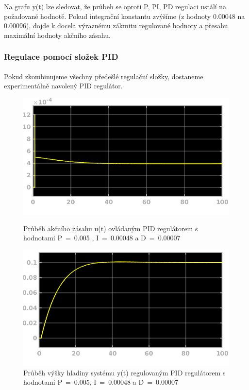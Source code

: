 \documentclass{article}
\begin{document}
	   		
	   		Na grafu y(t) lze sledovat, že průbeh se oproti P, PI, PD regulaci ustálí na požadované hodnotě. Pokud integrační konstantu zvýšíme (z hodnoty 0.00048 na 0.00096), dojde k docela výraznému zákmitu regulované hodnoty a přesahu maximální hodnoty akčního zásahu. 
	   		

	\subsubsection{Regulace pomocí složek PID}
	\paragraph{}
	Pokud zkombinujeme všechny předešlé regulační složky, dostaneme experimentálně navolený PID regulátor. 
	
		   	
	\begin{figure}[H]
	   		 \begin{minipage}[b]{.45\textwidth}
    \centering
    \includegraphics[width=\linewidth]{ukol3PIDu}
    \caption{Průběh akčního zásahu u(t) ovládaným PID regulátorem s hodnotami P~=~0.005 , I~=~0.00048 a D~=~0.00007}
  \end{minipage}\hfill
  \begin{minipage}[b]{.45\textwidth}
    \centering
    \includegraphics[width=\linewidth]{ukol3PIDy}
    \caption{Průběh výšky hladiny systému y(t) regulovaným PID regulátorem s hodnotami P~=~0.005, I~=~0.00048 a D~=~0.00007}
    \label{img:hladinaPID}
  \end{minipage}
	   		\end{figure}	
	   		
\end{document}
